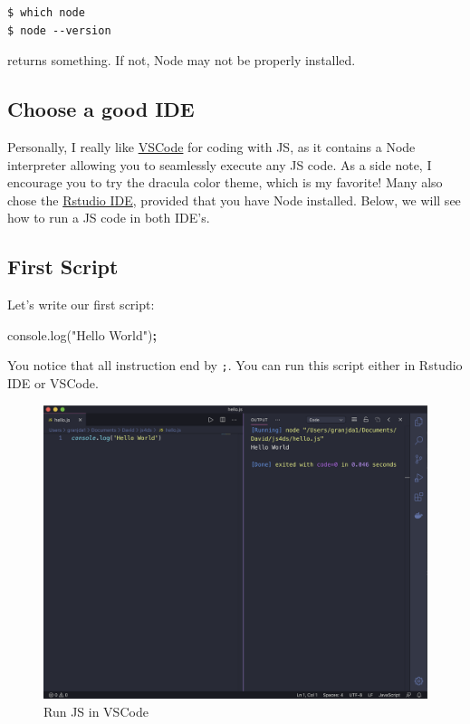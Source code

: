 \documentclass[]{book}
\newenvironment{Shaded}{\begin{snugshade}}{\end{snugshade}}
\newcommand{\AttributeTok}[1]{\textcolor[rgb]{0.77,0.63,0.00}{#1}}
\newcommand{\NormalTok}[1]{#1}
\newcommand{\OperatorTok}[1]{\textcolor[rgb]{0.81,0.36,0.00}{\textbf{#1}}}
\newcommand{\StringTok}[1]{\textcolor[rgb]{0.31,0.60,0.02}{#1}}
\newcommand{\VariableTok}[1]{\textcolor[rgb]{0.00,0.00,0.00}{#1}}
\begin{document}
\begin{verbatim}
$ which node
$ node --version
\end{verbatim}

returns something. If not, Node may not be properly installed.

\hypertarget{choose-a-good-ide}{%
\subsection{Choose a good IDE}\label{choose-a-good-ide}}

Personally, I really like \href{https://code.visualstudio.com}{VSCode} for coding with JS, as it contains a Node interpreter allowing you to seamlessly execute any JS code. As a side note, I encourage you to try the dracula color theme, which is my favorite! Many also chose the \href{https://rstudio.com/products/rstudio/}{Rstudio IDE}, provided that you have Node installed. Below, we will see how to run a JS code in both IDE's.

\hypertarget{first-script}{%
\subsection{First Script}\label{first-script}}

Let's write our first script:

\begin{Shaded}
\begin{Highlighting}[]
\VariableTok{console}\NormalTok{.}\AttributeTok{log}\NormalTok{(}\StringTok{"Hello World"}\NormalTok{)}\OperatorTok{;}
\end{Highlighting}
\end{Shaded}

You notice that all instruction end by \texttt{;}. You can run this script either in Rstudio IDE or VSCode.

\begin{figure}
\includegraphics[width=29.61in]{images/survival-kit/script-vscode} \caption{Run JS in VSCode}\label{fig:script-vscode}
\end{figure}
\end{document}
